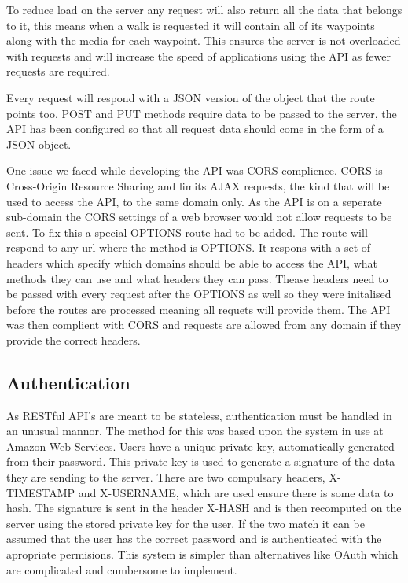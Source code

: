 \documentclass[11pt,a4paper]{article}
\begin{document}
To reduce load on the server any request will also return all the data that belongs to it, this means when a walk is requested it will contain all of its waypoints along with the media for each waypoint. This ensures the server is not overloaded with requests and will increase the speed of applications using the API as fewer requests are required.

Every request will respond with a JSON version of the object that the route points too. POST and PUT methods require data to be passed to the server, the API has been configured so that all request data should come in the form of a JSON object. 

One issue we faced while developing the API was CORS complience. CORS is Cross-Origin Resource Sharing and limits AJAX requests, the kind that will be used to access the API, to the same domain only. As the API is on a seperate sub-domain the CORS settings of a web browser would not allow requests to be sent. To fix this a special OPTIONS route had to be added. The route will respond to any url where the method is OPTIONS. It respons with a set of headers which specify which domains should be able to access the API, what methods they can use and what headers they can pass. Thease headers need to be passed with every request after the OPTIONS as well so they were initalised before the routes are processed meaning all requets will provide them. The API was then complient with CORS and requests are allowed from any domain if they provide the correct headers. 

\subsection{Authentication}

As RESTful API's are meant to be stateless, authentication must be handled in an unusual mannor. The method for this was based upon the system in use at Amazon Web Services\cite{auth}. Users have a unique private key, automatically generated from their password. This private key is used to generate a signature of the data they are sending to the server. There are two compulsary headers, X-TIMESTAMP and X-USERNAME, which are used ensure there is some data to hash. The signature is sent in the header X-HASH and is then recomputed on the server using the stored private key for the user. If the two match it can be assumed that the user has the correct password and is authenticated with the apropriate permisions. This system is simpler than alternatives like OAuth which are complicated and cumbersome to implement. 
\end{document}
